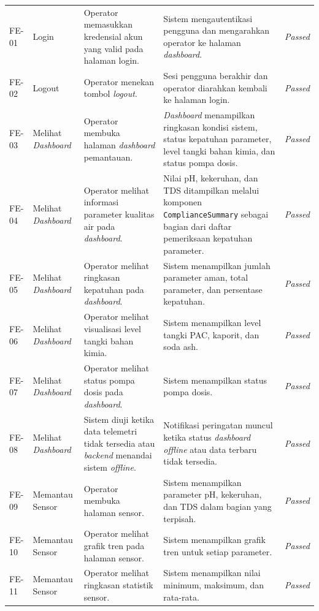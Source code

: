 \begin{longtable}{p{1.2cm}p{2.6cm}p{4.2cm}p{4.2cm}p{1.4cm}}
FE-01 & Login & Operator memasukkan kredensial akun yang valid pada halaman login. & Sistem mengautentikasi pengguna dan mengarahkan operator ke halaman \textit{dashboard}. & \textit{Passed} \\
FE-02 & Logout & Operator menekan tombol \textit{logout}. & Sesi pengguna berakhir dan operator diarahkan kembali ke halaman login. & \textit{Passed} \\
FE-03 & Melihat \textit{Dashboard} & Operator membuka halaman \textit{dashboard} pemantauan. & \textit{Dashboard} menampilkan ringkasan kondisi sistem, status kepatuhan parameter, level tangki bahan kimia, dan status pompa dosis. & \textit{Passed} \\
FE-04 & Melihat \textit{Dashboard} & Operator melihat informasi parameter kualitas air pada \textit{dashboard}. & Nilai pH, kekeruhan, dan TDS ditampilkan melalui komponen \texttt{ComplianceSummary} sebagai bagian dari daftar pemeriksaan kepatuhan parameter. & \textit{Passed} \\
FE-05 & Melihat \textit{Dashboard} & Operator melihat ringkasan kepatuhan pada \textit{dashboard}. & Sistem menampilkan jumlah parameter aman, total parameter, dan persentase kepatuhan. & \textit{Passed} \\
FE-06 & Melihat \textit{Dashboard} & Operator melihat visualisasi level tangki bahan kimia. & Sistem menampilkan level tangki PAC, kaporit, dan soda ash. & \textit{Passed} \\
FE-07 & Melihat \textit{Dashboard} & Operator melihat status pompa dosis pada \textit{dashboard}. & Sistem menampilkan status pompa dosis. & \textit{Passed} \\
FE-08 & Melihat \textit{Dashboard} & Sistem diuji ketika data telemetri tidak tersedia atau \textit{backend} menandai sistem \textit{offline}. & Notifikasi peringatan muncul ketika status \textit{dashboard} \textit{offline} atau data terbaru tidak tersedia. & \textit{Passed} \\
FE-09 & Memantau Sensor & Operator membuka halaman sensor. & Sistem menampilkan parameter pH, kekeruhan, dan TDS dalam bagian yang terpisah. & \textit{Passed} \\
FE-10 & Memantau Sensor & Operator melihat grafik tren pada halaman sensor. & Sistem menampilkan grafik tren untuk setiap parameter. & \textit{Passed} \\
FE-11 & Memantau Sensor & Operator melihat ringkasan statistik sensor. & Sistem menampilkan nilai minimum, maksimum, dan rata-rata. & \textit{Passed} \\

\end{longtable}
